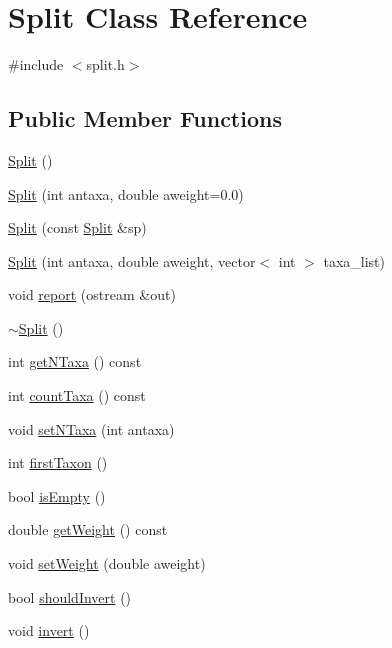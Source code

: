 \hypertarget{classSplit}{
\section{Split Class Reference}
\label{classSplit}
}


{\ttfamily \#include $<$split.h$>$}\subsection*{Public Member Functions}
\begin{DoxyCompactItemize}
\item 
\hyperlink{classSplit_a365a552fc4d3a0599c50ef629a691be4}{Split} ()
\item 
\hyperlink{classSplit_a94a33c0e8cfb74c40df1839c1a0bd843}{Split} (int antaxa, double aweight=0.0)
\item 
\hyperlink{classSplit_ad98691b8ee7de01dc6bb66eb5937f0ce}{Split} (const \hyperlink{classSplit}{Split} \&sp)
\item 
\hyperlink{classSplit_a9ef1d15c79111653ea9f2af81327630a}{Split} (int antaxa, double aweight, vector$<$ int $>$ taxa\_\-list)
\item 
void \hyperlink{classSplit_a62f6f9dd6849b2e3b5f4ff8d1a3131fd}{report} (ostream \&out)
\item 
\hyperlink{classSplit_a32ae47628734299802a079d19b70fc0a}{$\sim$Split} ()
\item 
int \hyperlink{classSplit_a3a2fd4ded9bc1d43c5cdb69b3d057e71}{getNTaxa} () const 
\item 
int \hyperlink{classSplit_af7441915bc8fed4333541b193e0394f4}{countTaxa} () const 
\item 
void \hyperlink{classSplit_a2d5be14eadb830619216ef12ddd512e7}{setNTaxa} (int antaxa)
\item 
int \hyperlink{classSplit_a2d63d14c00fa83c87afca7a412bced5d}{firstTaxon} ()
\item 
bool \hyperlink{classSplit_abb9262185c7f5bf5b9f6604c432a796f}{isEmpty} ()
\item 
double \hyperlink{classSplit_a08d9beb4e3b391de5b2aa13c57ea99ca}{getWeight} () const 
\item 
void \hyperlink{classSplit_a4c2f157bcf99e1522415915bb6823bb9}{setWeight} (double aweight)
\item 
bool \hyperlink{classSplit_a1e801d80a5667c140ee3f1ebe0137f07}{shouldInvert} ()
\item 
void \hyperlink{classSplit_aa1c5426a32b64ee0e56e980096a0074c}{invert} ()
\item 

\end{DoxyCompactItemize}

